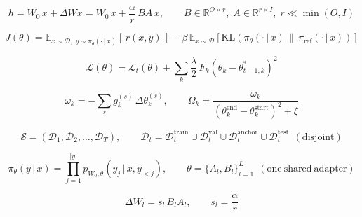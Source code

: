 
\begin{equation}
  h = W_0\,x + \Delta W x = W_0\,x + \frac{\alpha}{r}\,B A\,x,\qquad B\in\mathbb{R}^{O\times r},\; A\in\mathbb{R}^{r\times I},\; r \ll \min(O, I)
  \label{eq:eq_lora}
\end{equation}

\begin{equation}
  J(\theta) = \mathbb{E}_{x\sim\mathcal{D},\; y\sim\pi_\theta(\cdot\,|\,x)}\left[\, r(x, y)\,\right] - \beta\,\mathbb{E}_{x\sim\mathcal{D}}\left[\mathrm{KL}\left(\pi_\theta(\cdot\,|\,x)\,\|\,\pi_{\mathrm{ref}}(\cdot\,|\,x)\right)\right]
  \label{eq:eq_rl_objective}
\end{equation}

\begin{equation}
  \mathcal{L}(\theta) = \mathcal{L}_{t}(\theta) + \sum_{k} \frac{\lambda}{2}\,F_k\left(\theta_k - \theta^{*}_{t-1,k}\right)^2
  \label{eq:eq_ewc}
\end{equation}

\begin{equation}
  \omega_k = -\sum_{s} g_k^{(s)}\,\Delta\theta_k^{(s)},\qquad \Omega_k = \frac{\omega_k}{\left(\theta_k^{\mathrm{end}} - \theta_k^{\mathrm{start}}\right)^2 + \xi}
  \label{eq:eq_si}
\end{equation}

\begin{equation}
  \mathcal{S} = \left(\mathcal{D}_1, \mathcal{D}_2, \ldots, \mathcal{D}_T\right),\qquad \mathcal{D}_t = \mathcal{D}_t^{\mathrm{train}} \cup \mathcal{D}_t^{\mathrm{val}} \cup \mathcal{D}_t^{\mathrm{anchor}} \cup \mathcal{D}_t^{\mathrm{test}}\ \ (\mathrm{disjoint})
  \label{eq:eq_stream}
\end{equation}

\begin{equation}
  \pi_\theta(y\,|\,x) = \prod_{j=1}^{|y|} p_{W_0,\theta}\left(y_j \,|\, x, y_{<j}\right),\qquad \theta = \{A_l, B_l\}_{l=1}^{L}\ \ (\mathrm{one\ shared\ adapter})
  \label{eq:eq_policy}
\end{equation}

\begin{equation}
  \Delta W_l = s_l\,B_l A_l,\qquad s_l = \frac{\alpha}{r}
  \label{eq:eq_effective}
\end{equation}

